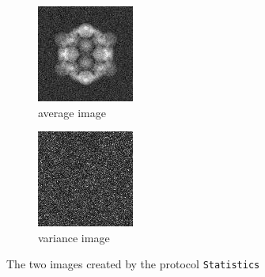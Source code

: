 \documentclass[12pt]{article} %
\newcommand{\ttt}[1]{\texttt{#1}}
\begin{document}
\begin{figure}[H]
\centering 
     \begin{subfigure}[b]{0.3\textwidth}
         \centering
         \includegraphics[width=\textwidth]{images/average.jpg}
         \caption{average image}
         \label{fig:average} 
     \end{subfigure}
     \begin{subfigure}[b]{0.3\textwidth}
         \centering
         \includegraphics[width=\textwidth]{images/variance.jpg}
         \caption{variance image}
         \label{fig:variance}
     \end{subfigure}
     \caption{The two images created by the protocol \ttt{Statistics}}
\end{figure}
\end{document}

